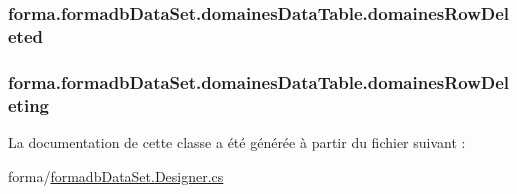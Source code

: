 \subsubsection[{\texorpdfstring{domaines\+Row\+Deleted}{domainesRowDeleted}}]{ forma.\+formadb\+Data\+Set.\+domaines\+Data\+Table.\+domaines\+Row\+Deleted}\hypertarget{classforma_1_1formadb_data_set_1_1domaines_data_table_a3c4135e48f94fbb6ff59bcfd0c51271a}{}\label{classforma_1_1formadb_data_set_1_1domaines_data_table_a3c4135e48f94fbb6ff59bcfd0c51271a}
\subsubsection[{\texorpdfstring{domaines\+Row\+Deleting}{domainesRowDeleting}}]{ forma.\+formadb\+Data\+Set.\+domaines\+Data\+Table.\+domaines\+Row\+Deleting}\hypertarget{classforma_1_1formadb_data_set_1_1domaines_data_table_aca49466dd8d41e04cdd443987da632be}{}\label{classforma_1_1formadb_data_set_1_1domaines_data_table_aca49466dd8d41e04cdd443987da632be}


La documentation de cette classe a été générée à partir du fichier suivant \+:\begin{DoxyCompactItemize}
\item 
forma/\hyperlink{formadb_data_set_8_designer_8cs}{formadb\+Data\+Set.\+Designer.\+cs}\end{DoxyCompactItemize}
